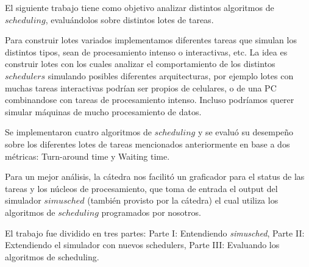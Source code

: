 El siguiente trabajo tiene como objetivo analizar distintos algoritmos de $scheduling$, evaluándolos sobre distintos lotes de tareas. 

Para construir lotes variados implementamos diferentes tareas que simulan los distintos tipos, sean de procesamiento intenso o interactivas, etc. La idea es construir lotes con los cuales analizar el comportamiento de los distintos $schedulers$ simulando posibles diferentes arquitecturas, por ejemplo lotes con muchas tareas interactivas podrían ser propios de celulares, o de una PC combinandose con tareas de procesamiento intenso. Incluso podríamos querer simular máquinas de mucho procesamiento de datos.

Se implementaron cuatro algoritmos de $scheduling$ y se evaluó su desempeño sobre los diferentes lotes de tareas mencionados anteriormente en base a dos métricas: Turn-around time y Waiting time.

Para un mejor análisis, la cátedra nos facilitó un graficador para el status de las tareas y los núcleos de procesamiento, que toma de entrada el output del simulador $simusched$ (también provisto por la cátedra) el cual utiliza los algoritmos de $scheduling$ programados por nosotros.

El trabajo fue dividido en tres partes: Parte I: Entendiendo \emph{simusched}, Parte II: Extendiendo el simulador con nuevos schedulers, Parte III: Evaluando los algoritmos de scheduling.
